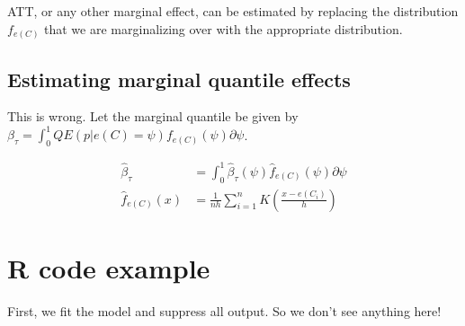 \documentclass{article}\usepackage[]{graphicx}\usepackage[]{color}
\def\betahat{{\widehat\beta}}
\begin{document}
ATT, or any other marginal effect, can be estimated by replacing the distribution $f_{e(C)}$ that we are marginalizing over with the appropriate distribution. 

\subsection{Estimating marginal quantile effects}

This is wrong. Let the marginal quantile be given by $ \beta_\tau = \int_0^1 QE(p|e(C)=\psi) f_{e(C)}(\psi) \partial \psi$. 

\begin{align*}
   \betahat_\tau &=  \int_0^1 \betahat_\tau(\psi) \widehat{f}_{e(C)}(\psi) \partial \psi \\
   \widehat{f}_{e(C)}(x) &= \frac{1}{nh} \sum_{i=1}^n K\left( \frac{x-e(C_i)}{h}\right)
\end{align*}


\section{R code example}

First, we fit the model and suppress all output. So we don't see anything here!
\end{document}
